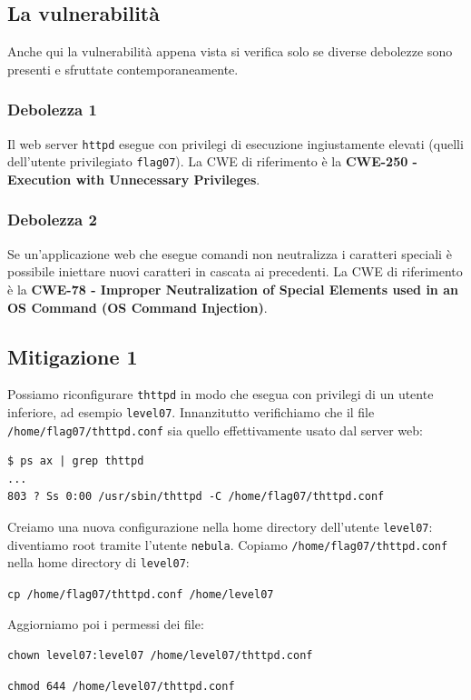 \subsection{La vulnerabilità}
Anche qui la vulnerabilità appena vista si verifica solo se diverse debolezze sono presenti e sfruttate contemporaneamente.

\subsubsection{Debolezza 1}
Il web server \texttt{httpd} esegue con privilegi di esecuzione ingiustamente elevati (quelli dell'utente privilegiato \texttt{flag07}). La CWE di riferimento è la \textbf{CWE-250 - Execution with Unnecessary Privileges}. 

\subsubsection{Debolezza 2}
Se un'applicazione web che esegue comandi non neutralizza i caratteri speciali è possibile iniettare nuovi caratteri in cascata ai precedenti. La CWE di riferimento è la \textbf{CWE-78 - Improper Neutralization of Special Elements used in an OS Command (OS Command Injection)}.

\subsection{Mitigazione 1}
Possiamo riconfigurare \texttt{thttpd} in modo che esegua con privilegi di un utente inferiore, ad esempio \texttt{level07}. Innanzitutto verifichiamo che il file \texttt{/home/flag07/thttpd.conf} sia quello effettivamente usato dal server web:

\begin{mdframed}[backgroundcolor=white!20,shadow=false]
\begin{lstlisting}
$ ps ax | grep thttpd
...
803 ? Ss 0:00 /usr/sbin/thttpd -C /home/flag07/thttpd.conf
\end{lstlisting}
\end{mdframed}

Creiamo una nuova configurazione nella home directory dell'utente \texttt{level07}: diventiamo root tramite l'utente \texttt{nebula}. Copiamo \texttt{/home/flag07/thttpd.conf} nella home directory di \texttt{level07}:
\begin{center}
    \texttt{cp /home/flag07/thttpd.conf /home/level07}
\end{center}
Aggiorniamo poi i permessi dei file:
\begin{center}
    \texttt{chown level07:level07 /home/level07/thttpd.conf}
    
    \texttt{chmod 644 /home/level07/thttpd.conf}
\end{center}

